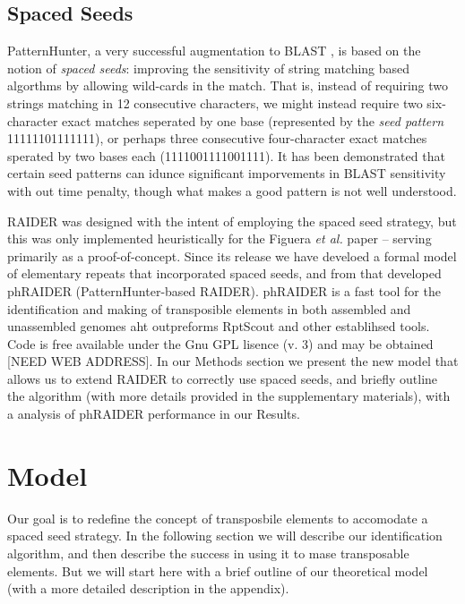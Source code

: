 \documentclass{bmcart}
\begin{document}
\subsection*{Spaced Seeds}
 
PatternHunter, a very successful augmentation to
BLAST \cite{Li:2004wl,Altschul:1997p843}, is based on the notion of {\it
  spaced seeds}: improving the sensitivity of string matching based
algorthms by allowing wild-cards in the match.  That is, instead of
requiring two strings matching in 12 consecutive characters, we might
instead require two six-character exact matches seperated by one base
(represented by the {\it seed pattern} 11111101111111), or perhaps
three consecutive four-character exact matches sperated by two bases
each (1111001111001111). It has been demonstrated that certain seed
patterns can idunce significant imporvements in BLAST sensitivity with
out time penalty, though what makes a good pattern is not well understood.


RAIDER was designed with the intent of employing the spaced seed
strategy, but this was only implemented heuristically for the Figuera
{\it et al.} paper \cite{Figueroa:2013cz} -- serving primarily as a
proof-of-concept.  Since its release we have develoed a formal model
of elementary repeats that incorporated spaced seeds, and from that
developed phRAIDER (PatternHunter-based RAIDER).  phRAIDER is a fast
tool for the identification and making of transposible elements in
both assembled and unassembled genomes aht outpreforms RptScout and
other establihsed tools. Code is free available under the Gnu GPL
lisence (v. 3) and  may be obtained [NEED WEB ADDRESS].  In our Methods section
we present the new model that allows us to extend RAIDER to correctly
use spaced seeds, and briefly outline the algorithm (with more details
provided in the supplementary materials), with a analysis of phRAIDER
performance in our Results.


\section*{Model}

Our goal is to redefine the concept of transposbile elements to
accomodate a spaced seed strategy.  In the following section we will describe our
identification algorithm, and then describe the success in using it to
mase transposable elements. But we will start here with a brief
outline of our theoretical model (with a more detailed description in
the appendix).
\end{document}
